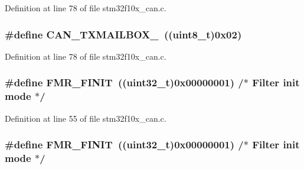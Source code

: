 Definition at line 78 of file stm32f10x\+\_\+can.\+c.

\subsubsection[{\texorpdfstring{C\+A\+N\+\_\+\+T\+X\+M\+A\+I\+L\+B\+O\+X\+\_\+2}{CAN_TXMAILBOX_2}}]{\setlength{\rightskip}{0pt plus 5cm}\#define C\+A\+N\+\_\+\+T\+X\+M\+A\+I\+L\+B\+O\+X\+\_~(({\bf uint8\+\_\+t})0x02)}\hypertarget{group___c_a_n___private___defines_ga8a842aa352d72321930cc963b26bf6d7}{}\label{group___c_a_n___private___defines_ga8a842aa352d72321930cc963b26bf6d7}


Definition at line 78 of file stm32f10x\+\_\+can.\+c.

\subsubsection[{\texorpdfstring{F\+M\+R\+\_\+\+F\+I\+N\+IT}{FMR_FINIT}}]{\setlength{\rightskip}{0pt plus 5cm}\#define F\+M\+R\+\_\+\+F\+I\+N\+IT~(({\bf uint32\+\_\+t})0x00000001) /$\ast$ Filter init mode $\ast$/}\hypertarget{group___c_a_n___private___defines_ga6125d0273c466e402db1a8f5bf888857}{}\label{group___c_a_n___private___defines_ga6125d0273c466e402db1a8f5bf888857}


Definition at line 55 of file stm32f10x\+\_\+can.\+c.

\subsubsection[{\texorpdfstring{F\+M\+R\+\_\+\+F\+I\+N\+IT}{FMR_FINIT}}]{\setlength{\rightskip}{0pt plus 5cm}\#define F\+M\+R\+\_\+\+F\+I\+N\+IT~(({\bf uint32\+\_\+t})0x00000001) /$\ast$ Filter init mode $\ast$/}\hypertarget{group___c_a_n___private___defines_ga6125d0273c466e402db1a8f5bf888857}{}\label{group___c_a_n___private___defines_ga6125d0273c466e402db1a8f5bf888857}


